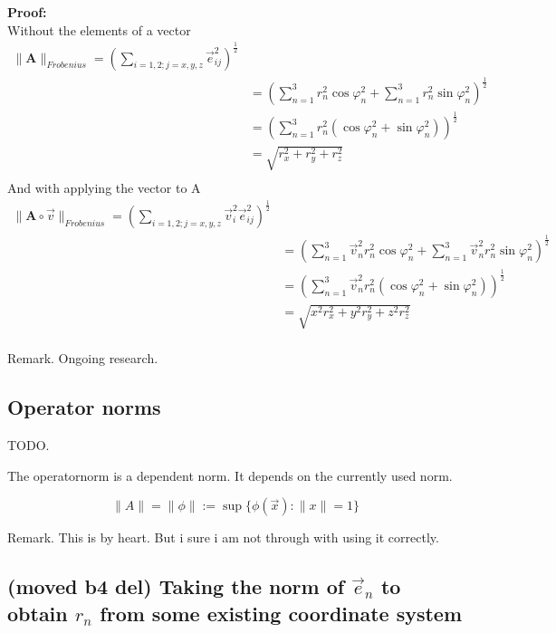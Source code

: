 \documentclass[a4paper]{article}
\begin{document}
\textbf{Proof:}\\
Without the elements of a vector 
\begin{displaymath}
\begin{align}
\|\boldsymbol{A}\|_{Frobenius} = (\sum_{i=1,2;j=x,y,z}\vec{e}_{ij}^{2})^{\frac{1}{2}} \\
&= (\sum_{n=1}^{3}r_{n}^{2}\cos\varphi_n^{2} + \sum_{n=1}^{3}r_{n}^{2}\sin\varphi_n^{2})^{\frac{1}{2}}\\
&= (\sum_{n=1}^{3}r_{n}^{2}(\cos\varphi_n^{2} + \sin\varphi_n^{2}))^{\frac{1}{2}}\\
&= \sqrt{r_{x}^{2}+r_{y}^{2}+r_{z}^{2}}\\
\end{align}
\end{displaymath}
And with applying the vector to A
\begin{displaymath}
\begin{align}
\|\boldsymbol{A}\circ\vec{v}\|_{Frobenius} = (\sum_{i=1,2;j=x,y,z}\vec{v}_{i}^{2}\vec{e}_{ij}^{2})^{\frac{1}{2}} \\
&= (\sum_{n=1}^{3}\vec{v}_{n}^{2}r_{n}^{2}\cos\varphi_n^{2} + \sum_{n=1}^{3}\vec{v}_{n}^{2}r_{n}^{2}\sin\varphi_n^{2})^{\frac{1}{2}}\\
&= (\sum_{n=1}^{3}\vec{v}_{n}^{2}r_{n}^{2}(\cos\varphi_n^{2} + \sin\varphi_n^{2}))^{\frac{1}{2}}\\
&= \sqrt{x^{2}r_{x}^{2}+y^{2}r_{y}^{2}+z^{2}r_{z}^{2}}\\
\end{align}
\end{displaymath}

Remark. Ongoing research.



\subsection{Operator norms}

TODO.

The operatornorm is a dependent norm. It depends on the currently used norm. 

\begin{displaymath}
\|A\| = \|\phi\| := \sup\{ \phi(\vec{x}) : \|x\|=1 \}
\end{displaymath}

Remark. This is by heart. But i sure i am not through with using it correctly.

\subsection{(moved b4 del) Taking the norm of $\vec{e}_n$ to obtain $r_n$ from some existing coordinate system}
\end{document}
